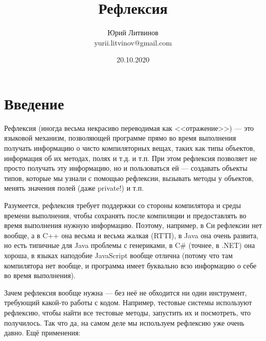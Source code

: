 \documentclass[a5paper]{article}
\title{Рефлексия}
\author{Юрий Литвинов\\\small{yurii.litvinov@gmail.com}}
\date{20.10.2020}
\begin{document}
\maketitle
\thispagestyle{empty}

\section*{Введение}

Рефлексия (иногда весьма некрасиво переводимая как <<отражение>>) --- это языковой механизм, позволяющей программе прямо во время выполнения получать информацию о чисто компиляторных вещах, таких как типы объектов, информация об их методах, полях и т.д. и т.п. При этом рефлексия позволяет не просто получать эту информацию, но и пользоваться ей --- создавать объекты типов, которые мы узнали с помощью рефлексии, вызывать методы у объектов, менять значения полей (даже private!) и т.п. 

Разумеется, рефлексия требует поддержки со стороны компилятора и среды времени выполнения, чтобы сохранять после компиляции и предоставлять во время выполнения нужную информацию. Поэтому, например, в Си рефлексии нет вообще, а в C++ она весьма и весьма жалкая (RTTI), в Java она очень развита, но есть типичные для Java проблемы с генериками, в C\# (точнее, в .NET) она хороша, в языках наподобие JavaScript вообще отлична (потому что там компилятора нет вообще, и программа имеет буквально всю информацию о себе во время выполнения).

Зачем рефлексия вообще нужна --- без неё не обходится ни один инструмент, требующий какой-то работы с кодом. Например, тестовые системы используют рефлексию, чтобы найти все тестовые методы, запустить их и посмотреть, что получилось. Так что да, на самом деле мы используем рефлексию уже очень давно. Ещё применения:
\end{document}
